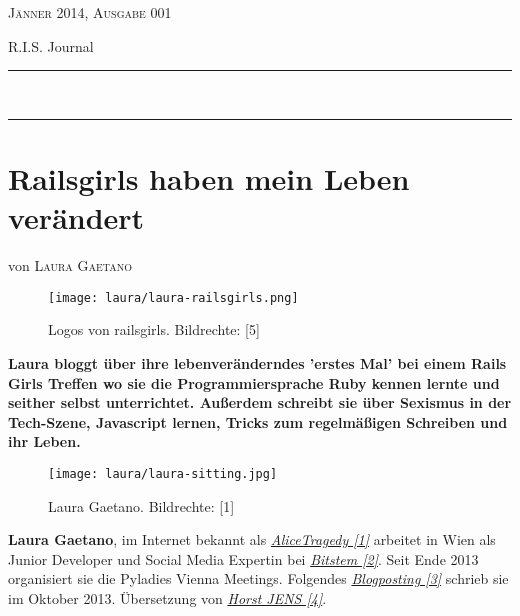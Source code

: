 \documentclass[10pt,a4paper,ngerman,twoside]{article} %
\newcommand{\HorRule}[1]{\noindent\rule{\linewidth}{#1}} %
\newcommand{\NewsletterName}[1]{ %
\begin{center}
\Huge \usefont{T1}{fvs}{b}{n} %
#1
\end{center}	
\par \normalsize \normalfont}
\newcommand{\JournalIssue}[1]{ %
\hfill \textsc{Jänner 2014, Ausgabe 001}
\par \normalsize \normalfont}
\newcommand{\NewsItem}[1]{ %
\usefont{T1}{fvs}{n}{n} %
\vspace{24pt}\large #1\vspace{3pt} %
\par \normalsize \normalfont}
\newcommand{\NewsAuthor}[1]{ %
\hfill von \textsc{#1} \vspace{20pt} %
\par \normalfont}
\begin{document}
\JournalIssue{1} %
\NewsletterName{R.I.S. Journal} %
\noindent\HorRule{3pt} \\[-0.75\baselineskip] %
\HorRule{1pt} %




%

\NewsItem{}
\section*{Railsgirls haben mein Leben verändert}
\label{laura}
\NewsAuthor{Laura Gaetano}

\begin{figure}
\texttt{[image: laura/laura-railsgirls.png]}
\caption{Logos von railsgirls. Bildrechte: [5]}
\end{figure}

\textbf{Laura bloggt über ihre lebenveränderndes 'erstes Mal' bei einem Rails Girls Treffen wo sie die Programmiersprache Ruby kennen lernte und seither selbst unterrichtet. Außerdem schreibt sie über Sexismus in der Tech-Szene, Javascript lernen, Tricks zum regelmäßigen Schreiben und ihr Leben.} \\

\begin{figure}
\texttt{[image: laura/laura-sitting.jpg]}
\caption{Laura Gaetano. Bildrechte: [1]}
\end{figure}

\textbf{Laura Gaetano}, im Internet bekannt als \href{http://www.alicetragedy.org/blog/}{\textit{AliceTragedy [1]}} arbeitet in Wien als Junior Developer und Social Media Expertin bei \href{http://bitstem.com}{\textit{Bitstem [2]}}. Seit Ende 2013 organisiert sie die Pyladies Vienna Meetings. Folgendes \href{http://www.alicetragedy.org/blog/?p=6271}{\textit{Blogposting [3]}} schrieb sie im Oktober 2013. Übersetzung von \href{http://spielend-programmieren.at}{\textit{Horst JENS [4]}}. \\
\end{document}
